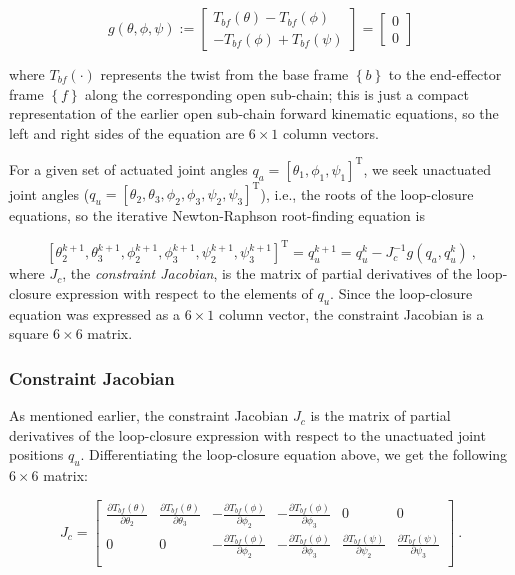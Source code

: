 \documentclass{report}
\begin{document}
\begin{equation} \label{loopClosureEq}
g(\theta,\phi,\psi):=
\begin{bmatrix}
T_{bf}(\theta) - T_{bf}(\phi)\\
-T_{bf}(\phi) + T_{bf}(\psi)
\end{bmatrix}
=
\begin{bmatrix}
0\\
0
\end{bmatrix}
\end{equation}

where $T_{bf}(\cdot)$ represents the twist from the base frame ${\left\lbrace b\right\rbrace }$ to the end-effector frame ${\left\lbrace f\right\rbrace }$ along the corresponding open sub-chain; this is just a compact representation of the earlier open sub-chain forward kinematic equations, so the left and right sides of the equation are $6\times 1$ column vectors.

For a given set of actuated joint angles $q_{a} = \left[\theta_{1}, \phi_{1}, \psi_{1} \right]^{\text{T}} $, we seek unactuated joint angles ($q_{u} = \left[\theta_{2},\theta_{3},\phi_{2},\phi_{3},\psi_{2},\psi_{3} \right]^{\text{T}}$), i.e., the roots of the loop-closure equations, so the iterative Newton-Raphson root-finding equation is

\begin{equation}
\left[\theta_{2}^{k+1},\theta_{3}^{k+1},\phi_{2}^{k+1},\phi_{3}^{k+1},\psi_{2}^{k+1},\psi_{3}^{k+1}\right]^{\text{T}} = q_{u}^{k+1} = q_{u}^{k} - J_{c}^{-1}g\left(q_{a},q_{u}^{k}\right)\ \text{,}
\end{equation}
where $J_{c}$, the \textit{constraint Jacobian}, is the matrix of partial derivatives of the loop-closure expression with respect to the elements of $q_{u}$. Since the loop-closure equation was expressed as a $6\times 1$ column vector, the constraint Jacobian is a square $6\times 6$ matrix.

\subsubsection[Constraint Jacobian]{Constraint Jacobian}
As mentioned earlier, the constraint Jacobian $J_{c}$ is the matrix of partial derivatives of the loop-closure expression with respect to the unactuated joint positions $q_{u}$. Differentiating the loop-closure equation above, we get the following $6\times 6$ matrix:

\begin{equation} \label{constraintJacobian}
J_c = 
\begin{bmatrix}
\frac{\partial T_{bf}(\theta)}{\partial \theta_{2}} & \frac{\partial T_{bf}(\theta)}{\partial \theta_{3}} & -\frac{\partial T_{bf}(\phi)}{\partial \phi_{2}} & -\frac{\partial T_{bf}(\phi)}{\partial \phi_{3}} & 0 & 0 \\
0 & 0 & -\frac{\partial T_{bf}(\phi)}{\partial \phi_{2}} & -\frac{\partial T_{bf}(\phi)}{\partial \phi_{3}} & \frac{\partial T_{bf}(\psi)}{\partial \psi_{2}} & \frac{\partial T_{bf}(\psi)}{\partial \psi_{3}} \\
\end{bmatrix}\ \text{.}
\end{equation}
\end{document}

